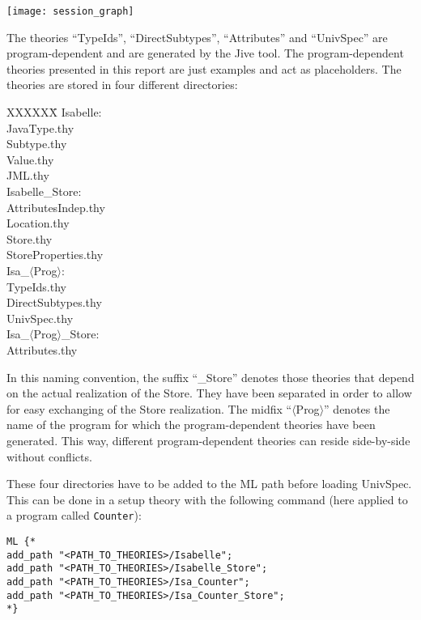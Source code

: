 \documentclass[11pt,a4paper,twoside]{article}
\begin{document}
\begin{center}
\texttt{[image: session\_graph]}
\end{center}

The theories ``TypeIds'', ``DirectSubtypes'', ``Attributes'' and ``UnivSpec'' are 
program-dependent and are
generated by the Jive tool. The program-dependent theories  presented in this report are just examples and act as
placeholders. The theories are stored in four different directories:

\begin{tabbing}
XXXXXX\= \kill
Isabelle:\\
\>JavaType.thy \\
\>Subtype.thy \\
\>Value.thy \\
\>JML.thy \\

Isabelle\_Store: \\
\>AttributesIndep.thy \\
\>Location.thy \\
\>Store.thy \\
\>StoreProperties.thy \\

Isa\_$\langle$Prog$\rangle$: \\
\>TypeIds.thy \\
\>DirectSubtypes.thy \\
\>UnivSpec.thy \\

Isa\_$\langle$Prog$\rangle$\_Store: \\
\>Attributes.thy
\end{tabbing}

In this naming convention, the suffix ``\_Store'' denotes those theories that depend on the actual realization of the Store. They have
been separated in order to allow for easy exchanging of the Store realization. The midfix ``$\langle$Prog$\rangle$'' denotes the name
of the program for which the program-dependent theories have been generated. This way, different program-dependent theories can reside
side-by-side without conflicts.

These four directories have to be added to the ML path before loading UnivSpec. This can be done in a
setup theory with the following command (here applied to a program called \texttt{Counter}):

\begin{verbatim}
ML {*
add_path "<PATH_TO_THEORIES>/Isabelle";
add_path "<PATH_TO_THEORIES>/Isabelle_Store";
add_path "<PATH_TO_THEORIES>/Isa_Counter";
add_path "<PATH_TO_THEORIES>/Isa_Counter_Store";
*}
\end{verbatim}
\end{document}
